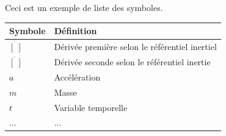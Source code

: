 Ceci est un exemple de liste des symboles.

\begin{center}
\begin{tabular}{ll}
\toprule
\textbf{Symbole} & \textbf{Définition} \\ \midrule
$\dot{[~]}$  & Dérivée première selon le référentiel inertiel \\
$\ddot{[~]}$ & Dérivée seconde selon le référentiel inertie \\
$a$ & Accélération \\
$m$ & Masse \\
$t$ & Variable temporelle \\
... & ... \\
\bottomrule
\end{tabular}
\end{center}
